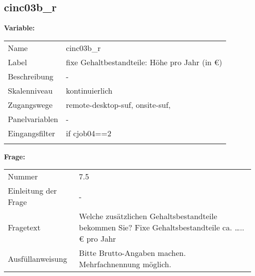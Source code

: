 	
	
	\subsection{cinc03b\_r}
	\label{subSection:cinc03b_r}

	\noindent\textbf{Variable:}\\
		\begin{tabular}{lL{11.3cm}}
			\label{tableVariable:cinc03b_r}
			Name & cinc03b\_r \\
			Label & fixe Gehaltbestandteile: Höhe pro Jahr (in €) \\
			Beschreibung & - \\
			Skalenniveau & kontinuierlich \\
			Zugangswege &
				remote-desktop-suf,
				onsite-suf,
 \\
			Panelvariablen & -
			 \\
			Eingangsfilter & if cjob04==2 \\
 \\
		\end{tabular}

		\vspace*{1 cm}
		\noindent\textbf{Frage:}\\
		\begin{tabular}{lL{11.3cm}}
			\label{tableQuestion:cinc03b_r}
			Nummer & 7.5 \\
			Einleitung der Frage & - \\
			Fragetext & Welche zusätzlichen Gehaltsbestandteile bekommen Sie?
Fixe Gehaltsbestandteile
ca. …..€ pro Jahr \\
			Ausfüllanweisung & 
Bitte Brutto-Angaben machen. Mehrfachnennung möglich. \\
		\end{tabular}




